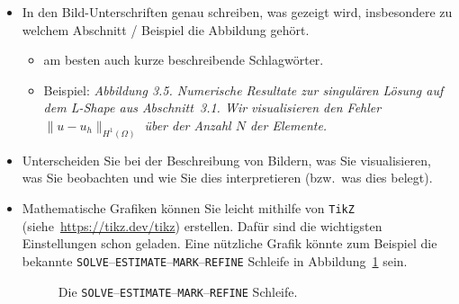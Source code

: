 \begin{itemize}
  \item In den Bild-Unterschriften genau schreiben, was gezeigt wird, insbesondere zu welchem Abschnitt / Beispiel die Abbildung gehört.
        \begin{itemize}
          \item am besten auch kurze beschreibende Schlagwörter.
          \item Beispiel: \emph{Abbildung 3.5. Numerische Resultate zur singulären Lösung auf dem L-Shape aus  Abschnitt~3.1. Wir visualisieren den Fehler $\|u-u_h\|_{H^1(\Omega)}$ über der Anzahl $N$ der Elemente.}
        \end{itemize}

  \item Unterscheiden Sie bei der Beschreibung von Bildern, was Sie visualisieren, was Sie beobachten und wie Sie dies interpretieren (bzw.\ was dies belegt).

  \item Mathematische Grafiken können Sie leicht mithilfe von \verb$TikZ$ (siehe~\url{https://tikz.dev/tikz}) erstellen. Dafür sind die wichtigsten Einstellungen schon geladen. Eine nützliche Grafik könnte zum Beispiel die bekannte \texttt{SOLVE}--\texttt{ESTIMATE}--\texttt{MARK}--\texttt{REFINE} Schleife in Abbildung~\ref{fig:afem} sein.
        \begin{figure}[ht!]
          \centering
          \caption{Die \texttt{SOLVE}--\texttt{ESTIMATE}--\texttt{MARK}--\texttt{REFINE} Schleife.\label{fig:afem}}
        \end{figure}


\end{itemize}
